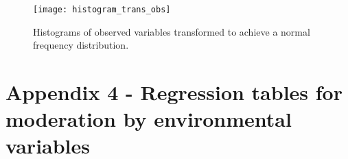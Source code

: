 \documentclass[11pt,a4paper]{article}
\begin{document}
\begin{figure}[H]
\centering
	\texttt{[image: histogram\_trans\_obs]}
	\caption{Histograms of observed variables transformed to achieve a normal frequency distribution.}
	\label{histogram_trans_obs}
\end{figure}

\section*{Appendix 4 - Regression tables for moderation by environmental variables}




\end{document}
